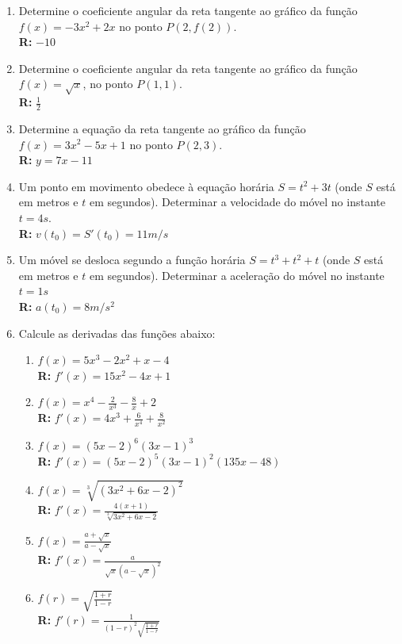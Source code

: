 \documentclass[oneside,a4paper,12pt]{article}
\begin{document}
\begin{enumerate}
	
	\item Determine o coeficiente angular da reta tangente ao gráfico da função $f(x) = -3x^2 + 2x$ no ponto $P(2,f(2))$. \\ {\bf R:} $-10$
	
	\item Determine o coeficiente angular da reta tangente ao gráfico da função $f(x) = \sqrt{x}$, no ponto $P(1,1)$. \\ {\bf R:} $\frac{1}{2}$
	
	\item Determine a equação da reta tangente ao gráfico da função $f(x) = 3x^2 -5x + 1$ no ponto $P(2,3)$. \\ {\bf R:} $y = 7x - 11$
	
	\item Um ponto em movimento obedece à equação horária $S = t^2 + 3t$ (onde $S$ está em metros e $t$ em segundos). Determinar a velocidade do móvel no instante $t=4s$. \\ {\bf R:} $v(t_0)=S'(t_0)=11m/s$
	
	\item Um móvel se desloca segundo a função horária $S = t^3 + t^2 + t$ (onde $S$ está em metros e $t$ em segundos). Determinar a aceleração do móvel no instante $t = 1s$ \\ {\bf R:} $a(t_0) = 8m/s^2$
	
	\item Calcule as derivadas das funções abaixo:
		\begin{enumerate}
			\item $f(x) = 5x^3 - 2x^2 + x - 4$ \\ {\bf R:} $f'(x) = 15x^2 - 4x + 1$
			\item $f(x) = x^4 - \frac{2}{x^3} - \frac{8}{x} + 2$ \\ {\bf R:} $f'(x) = 4x^3 + \frac{6}{x^4} + \frac{8}{x^2}$
			\item $f(x) = (5x-2)^6(3x-1)^3$ \\ {\bf R:} $f'(x) = (5x-2)^5(3x-1)^2(135x-48)$
			\item $f(x) = \sqrt[3]{(3x^2 +6x - 2)^2}$ \\ {\bf R:} $f'(x) = \frac{4(x+1)}{\sqrt[3]{3x^2+6x-2}}$
			\item $f(x) = \frac{a + \sqrt{x}}{a - \sqrt{x}}$ \\ {\bf R:} $f'(x) = \frac{a}{\sqrt{x}(a - \sqrt{x})^2}$
			\item $f(r) = \sqrt{\frac{1+r}{1-r}}$ \\ {\bf R:} $f'(r) = \frac{1}{(1-r)^2\sqrt{\frac{1+r}{1-r}}}$			
		\end{enumerate}
	

\end{enumerate}
\end{document}
